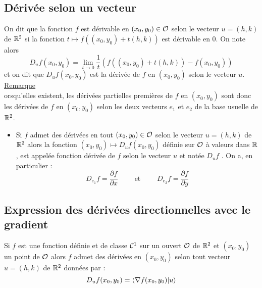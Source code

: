 \subsection{Dérivée selon un vecteur}
\begin{defprop}
     On dit que la fonction \(f\) est dérivable en \((x_0, y_0) \in \cal{O}\) selon le vecteur \(u = (h, k)\) de \(\R^2\) si la fonction \(t \mapsto f ((x_0, y_0) + t(h, k))\) est dérivable en \(0\). On note alors
     \[D_uf (x_0, y_0) = \lim_{t\to 0} \frac{1}{t} (f ((x_0, y_0) + t(h, k)) - f (x_0, y_0))\]
    et on dit que \(D_uf (x_0, y_0)\) est la dérivée de \(f\) en \((x_0, y_0)\) selon le vecteur \(u\).\\
    \underline{Remarque}\\
    orsqu’elles existent, les dérivées partielles premières de \(f\) en \((x_0, y_0)\) sont donc les dérivées de \(f\) en \((x_0, y_0)\) selon les deux vecteurs \(e_1\) et \(e_2\) de la base usuelle de \(\R^2\).
    \begin{itemize}
        \item Si \(f\) admet des dérivées en tout \((x_0, y_0) \in \cal{O}\) selon le vecteur \(u = (h, k)\) de \(\R^2\) alors la fonction \((x_0, y_0) \mapsto D_uf (x_0, y_0)\) définie sur \(\cal{O}\) à valeurs dans \(\R\), est appelée fonction dérivée de \(f\) selon le vecteur \(u\) et notée \(D_uf\) . On a, en particulier :
        \[D_{e_1} f = \frac{\partial f}{\partial x} \qquad \text{ et } \qquad D_{e_2} f = \frac{\partial f}{\partial y}\]
    \end{itemize}
\end{defprop}

\subsection{Expression des dérivées directionnelles avec le gradient}
\begin{defprop}
    Si \(f\) est une fonction définie et de classe \(\cal{C}^{1}\) sur un ouvert \(\cal{O}\) de \(\R^2\) et \((x_0, y_0)\) un point de \(\cal{O}\) alors \(f\) admet des dérivées en \((x_0, y_0)\) selon tout vecteur \(u = (h, k)\) de \(\R^2\) données par :
        \[ D_uf (x_0, y_0) = \scal{ \nabla f (x_0, y_0)}{u} \]
\end{defprop}

